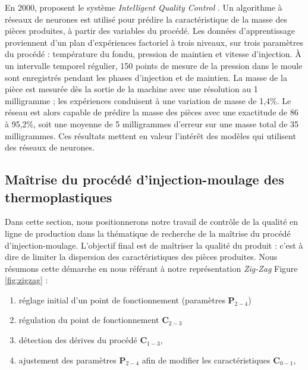 
En 2000, \citeauthor{schnerr-haselbarth_automation_2000} proposent le système \textit{Intelligent Quality Control} \cite{schnerr-haselbarth_automation_2000}.
Un algorithme à réseaux de neurones est utilisé pour prédire la caractéristique de la masse des pièces produites, à partir des variables du procédé.
Les données d’apprentissage proviennent d’un plan d'expériences factoriel à trois niveaux, sur trois paramètres du procédé : température du fondu, pression de maintien et vitesse d’injection.
À un intervalle temporel régulier, 150 points de mesure de la pression dans le moule sont enregistrés pendant les phases d’injection et de maintien.
La masse de la pièce est mesurée dès la sortie de la machine avec une résolution au 1 milligramme ; les expériences conduisent à une variation de masse de 1,4\%.
Le réseau est alors capable de prédire la masse des pièces avec une exactitude de 86 à 95,2\%, soit une moyenne de 5 milligrammes d’erreur sur une masse total de 35 milligrammes.
Ces résultats mettent en valeur l'intérêt des modèles qui utilisent des réseaux de neurones.

\subsection{Maîtrise du procédé d'injection-moulage des thermoplastiques} \label{subsec:process_control}
Dans cette section, nous positionnerons notre travail de contrôle de la qualité en ligne de production dans la thématique de recherche de la maîtrise du procédé d'injection-moulage.
L'objectif final est de maîtriser la qualité du produit : c'est à dire de limiter la dispersion des caractéristiques des pièces produites.
Nous résumons cette démarche en nous référant à notre représentation \textit{Zig-Zag} Figure \ref{fig:zigzag} :
\begin{enumerate}
	\item réglage initial d'un point de fonctionnement (paramètres $\boldsymbol{P}_{2-4}$)  %
	\item régulation du point de fonctionnement $\boldsymbol{C}_{2-3}$  %
	\item détection des dérives du procédé $\boldsymbol{C}_{1-3}$,
	\item ajustement des paramètres $\boldsymbol{P}_{2-4}$ afin de modifier les caractéristiques $\boldsymbol{C}_{0-1}$,
\end{enumerate}

